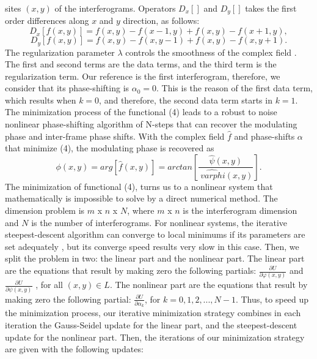 sites $(x,y)$ of the interferograms. Operators $D_{x}[]$ and $D_{y}[]$
takes the first order differences along $x$ and $y$ direction, as
follows:
\begin{equation}
D_{x}[f(x,y)]=f(x,y)-f(x-1,y)+f(x,y)-f(x+1,y),
\end{equation}
\begin{equation}
D_{y}[f(x,y)]=f(x,y)-f(x,y-1)+f(x,y)-f(x,y+1).
\end{equation}
The regularization parameter $\lambda$ controls the smoothness of
the complex field \cite{RQF,AQF_mult}. The first and second terms are
the data terms, and the third term is the regularization term. Our
reference is the first interferogram, therefore, we consider that
its phase-shifting is $\alpha_{0}=0$. This is the reason of the first
data term, which results when $k=0$, and therefore, the second data
term starts in $k=1$. The minimization process of the functional
(4) leads to a robust to noise nonlinear phase-shifting algorithm
of N-steps that can recover the modulating phase and inter-frame phase
shifts. With the complex field $\widehat{f}$ and phase-shifts $\alpha$
that minimize (4), the modulating phase is recovered as 
\begin{equation}
\phi(x,y)=arg[\widehat{f}(x,y)]=arctan\left[\frac{\hat{\psi}(x,y)}{\widehat{\
varphi}(x,y)}\right].\label{eq:fi}
\end{equation}
The minimization of functional (4), turns us to a nonlinear system
that mathematically is impossible to solve by a direct numerical method.
The dimension problem is $m$ x $n$ x $N$, where $m$ x $n$ is
the interferogram dimension and $N$ is the number of interferograms.
For nonlinear systems, the iterative\emph{ }steepest-descent algorithm
can converge to local minimums if its parameters are set adequately
\cite{Nocedal}, but its converge speed results very slow in this case.
Then, we split the problem in two: the linear part and the nonlinear
part. The linear part are the equations that result by making zero
the following partials: $\frac{\partial U}{\partial\varphi(x,y)}$
and $\frac{\partial U}{\partial\psi(x,y)}$ , for all $(x,y)\in L$.
The nonlinear part are the equations that result by making zero the
following partial: $\frac{\partial U}{\partial\alpha_{k}}$, for $k=0,1,2,...,N-
1$.
Thus, to speed up the minimization process, our iterative minimization
strategy combines in each iteration the Gauss-Seidel update for the
linear part, and the steepest-descent update for the nonlinear part.
Then, the iterations of our minimization strategy are given with the
following updates: 

